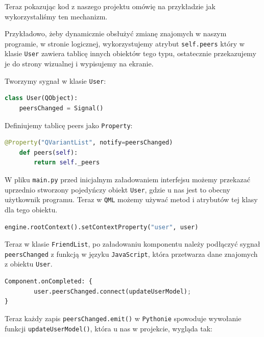 Teraz pokazując kod z naszego projektu omówię na przykładzie jak wykorzystaliśmy ten mechanizm.

Przykładowo, żeby dynamicznie obsłużyć zmianę znajomych w naszym programie, w stronie logicznej, wykorzystujemy atrybut \texttt{self.peers} który w klasie \texttt{User} zawiera tablicę innych obiektów tego typu, ostatecznie przekazujemy je do strony wizualnej i wypisujemy na ekranie.

Tworzymy sygnał w klasie \texttt{User}:
\begin{lstlisting}[language=Python, caption={Sygnał User}]
class User(QObject):
    peersChanged = Signal()
\end{lstlisting}   

Definiujemy tablicę peers jako \texttt{Property}:
\begin{lstlisting}[language=Python, caption={Peers Property}]
@Property("QVariantList", notify=peersChanged)
    def peers(self):
        return self._peers
\end{lstlisting}

W pliku \texttt{main.py} przed inicjalnym załadowaniem interfejsu możemy przekazać uprzednio stworzony pojedyńczy obiekt \texttt{User}, gdzie u nas jest to obecny użytkownik programu. Teraz w \texttt{QML} możemy używać metod i atrybutów tej klasy dla tego obiektu.

\begin{lstlisting}[language=Python, caption={Przekazanie inicjalnego obiektu}]
engine.rootContext().setContextProperty("user", user)
\end{lstlisting}

Teraz w klasie \texttt{FriendList}, po załadowaniu komponentu należy podłączyć sygnał \texttt{peersChanged} z funkcją w języku \texttt{JavaScript}, która przetwarza dane znajomych z obiektu \texttt{User}.

\begin{lstlisting}[language=Python, caption={Podłączenie sygnału do slota w QML}]
Component.onCompleted: {
        user.peersChanged.connect(updateUserModel);
}
\end{lstlisting}
Teraz każdy zapis \texttt{peersChanged.emit()} w \texttt{Pythonie} spowoduje wywołanie funkcji \texttt{updateUserModel()}, która u nas w projekcie, wygląda tak:


